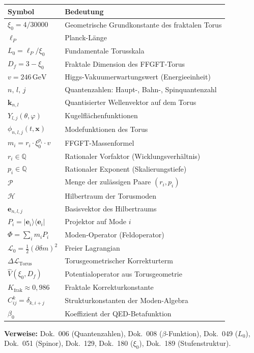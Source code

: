 \begin{center}
{\footnotesize
\begin{tabular}{lp{8.5cm}}
\toprule
\textbf{Symbol} & \textbf{Bedeutung} \\
\midrule
$\xi_0 = 4/30000$ & Geometrische Grundkonstante des fraktalen Torus \\
$\ell_P$ & Planck-Länge \\
$L_0 = \ell_P/\xi_0$ & Fundamentale Torusskala \\
$D_f = 3-\xi_0$ & Fraktale Dimension des FFGFT-Torus \\
$v = 246\,\text{GeV}$ & Higgs-Vakuumerwartungswert (Energieeinheit) \\
$n,\,l,\,j$ & Quantenzahlen: Haupt-, Bahn-, Spinquantenzahl \\
$\mathbf{k}_{n,l}$ & Quantisierter Wellenvektor auf dem Torus \\
$Y_{l,j}(\theta,\varphi)$ & Kugelflächenfunktionen \\
$\phi_{n,l,j}(t,\mathbf{x})$ & Modefunktionen des Torus \\
$m_i = r_i\cdot\xi_0^{p_i}\cdot v$ & FFGFT-Massenformel \\
$r_i \in \mathbb{Q}$ & Rationaler Vorfaktor (Wicklungsverhältnis) \\
$p_i \in \mathbb{Q}$ & Rationaler Exponent (Skalierungstiefe) \\
$\mathcal{P}$ & Menge der zulässigen Paare $(r_i, p_i)$ \\
$\mathcal{H}$ & Hilbertraum der Torusmoden \\
$\mathbf{e}_{n,l,j}$ & Basisvektor des Hilbertraums \\
$P_i = |\mathbf{e}_i\rangle\langle\mathbf{e}_i|$ & Projektor auf Mode $i$ \\
$\Phi = \sum_i m_i P_i$ & Moden-Operator (Feldoperator) \\
$\mathcal{L}_0 = \frac{1}{2}(\partial\delta m)^2$ & Freier Lagrangian \\
$\Delta\mathcal{L}_{\text{Torus}}$ & Torusgeometrischer Korrekturterm \\
$\hat{V}(\xi_0, D_f)$ & Potentialoperator aus Torusgeometrie \\
$K_{\text{frak}} \approx 0{,}986$ & Fraktale Korrekturkonstante \\
$C^k_{ij} = \delta_{k,i+j}$ & Strukturkonstanten der Moden-Algebra \\
$\beta_0$ & Koeffizient der QED-Betafunktion \\
\bottomrule
\end{tabular}
}
\end{center}

\medskip\noindent
\textbf{Verweise:} Dok.~006 (Quantenzahlen), Dok.~008 ($\beta$-Funktion),
Dok.~049 ($L_0$), Dok.~051 (Spinor), Dok.~129, Dok.~180 ($\xi_0$),
Dok.~189 (Stufenstruktur).
